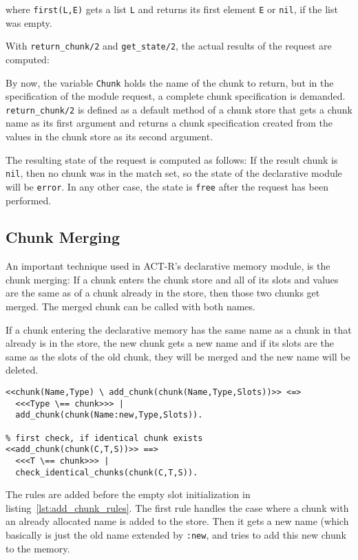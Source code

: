 where \lstinline|first(L,E)| gets a list \lstinline|L| and returns its first element \lstinline|E| or \lstinline|nil|, if the list was empty.

With \lstinline|return_chunk/2| and \lstinline|get_state/2|, the actual results of the request are computed:

By now, the variable \lstinline|Chunk| holds the name of the chunk to return, but in the specification of the module request, a complete chunk specification is demanded. \lstinline|return_chunk/2| is defined as a default method of a chunk store that gets a chunk name as its first argument and returns a chunk specification created from the values in the chunk store as its second argument.

The resulting state of the request is computed as follows: If the result chunk is \lstinline|nil|, then no chunk was in the match set, so the state of the declarative module will be \lstinline|error|. In any other case, the state is \lstinline|free| after the request has been performed.

\subsection{Chunk Merging}

An important technique used in ACT-R's declarative memory module, is the chunk merging: If a chunk enters the chunk store and all of its slots and values are the same as of a chunk already in the store, then those two chunks get merged. The merged chunk can be called with both names.

If a chunk entering the declarative memory has the same name as a chunk in that already is in the store, the new chunk gets a new name and if its slots are the same as the slots of the old chunk, they will be merged and the new name will be deleted.

\begin{lstlisting}
<<chunk(Name,Type) \ add_chunk(chunk(Name,Type,Slots))>> <=>
  <<<Type \== chunk>>> |
  add_chunk(chunk(Name:new,Type,Slots)).

% first check, if identical chunk exists
<<add_chunk(chunk(C,T,S))>> ==> 
  <<<T \== chunk>>> | 
  check_identical_chunks(chunk(C,T,S)).
\end{lstlisting}

The rules are added before the empty slot initialization in listing~\ref{lst:add_chunk_rules}. The first rule handles the case where a chunk with an already allocated name is added to the store. Then it gets a new name (which basically is just the old name extended by \lstinline|:new|, and tries to add this new chunk to the memory. 

